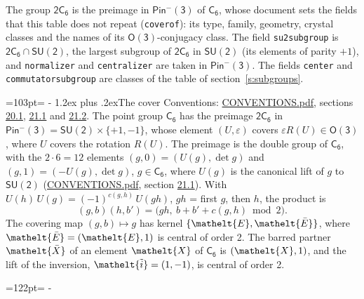\documentclass[10pt,a4paper]{article}
\makeatletter
\renewcommand\section{\@startsection{section}{1}{\z@}{-3ex plus -1ex minus -.2ex}%
  {1.2ex plus .2ex}{\normalfont\large\sffamily\bfseries\color{parttitle}}}
\newcommand{\needspace}[1]{\par\penalty-100\begingroup\dimen0=#1\relax\dimen2=\pagegoal
  \advance\dimen2-\pagetotal\ifdim\dimen0>\dimen2\relax\ifdim\dimen2>0pt\vfil\break\fi\fi
  \endgroup}
\numberwithin{equation}{section}
\newcommand{\eltfont}[1]{{\let\sigma\eltsigma\mathelt{#1}}}
\newcommand{\grp}[1]{\mathsf{#1}}
\newcommand{\elt}[1]{\eltfont{#1}}
\newcommand{\dirprod}{\times}
\newcommand{\barred}[1]{\bar{#1}}
\newcommand{\lift}[1]{\tilde{#1}}
\makeatother
\begin{document}
\leavevmode\label{n:element.inversion}\label{n:group.preimage}The group $\grp{2C_{6}}$ is the preimage in $\grp{Pin^{-}(3)}$ of \href{../../../rotation/data/pdf/C6.pdf}{$\grp{C_{6}}$}, whose document sets the fields that this table does not repeat (\texttt{coverof}): its type, family, geometry, crystal classes and the names of its \href{../../../rotation/data/pdf/O3.pdf}{$\grp{O(3)}$}-conjugacy class. The field \texttt{su2subgroup} is $\grp{2C_{6}} \cap \grp{SU(2)}$, the largest subgroup of $\grp{2C_{6}}$ in $\grp{SU(2)}$ (its elements of parity $+1$), and \texttt{normalizer} and \texttt{centralizer} are taken in $\grp{Pin^{-}(3)}$. The fields \texttt{center} and \texttt{commutatorsubgroup} are classes of the table of section~\ref{s:subgroups}.
\needspace{103pt}
\section{The cover}\label{s:cover}
Conventions: \href{../../CONVENTIONS.pdf}{CONVENTIONS.pdf}, sections \href{../../CONVENTIONS.pdf\#conv.20.1}{20.1}, \href{../../CONVENTIONS.pdf\#conv.21.1}{21.1} and \href{../../CONVENTIONS.pdf\#conv.21.2}{21.2}.
\leavevmode\label{n:group.pin.minus}\label{n:group.su2}\label{n:local.pin.sign}\label{n:matrix.covered}\label{n:matrix.lift.su2}\label{n:index.bar}The point group $\grp{C_{6}}$ has the preimage $\grp{2C_{6}}$ in $\grp{Pin^{-}(3)} = \grp{SU(2)} \dirprod \{+1, -1\}$, whose element $(U, \varepsilon)$ covers $\varepsilon R(U) \in \grp{O(3)}$, where $U$ covers the rotation $R(U)$. The preimage is the double group of $\grp{C_{6}}$, with the $2 \cdot 6 = 12$ elements $(g, 0) = (U(g), \det g)$ and $(g, 1) = (-U(g), \det g)$, $g \in \grp{C_{6}}$, where $U(g)$ is the canonical lift of $g$ to $\grp{SU(2)}$ (\href{../../CONVENTIONS.pdf}{CONVENTIONS.pdf}, section \href{../../CONVENTIONS.pdf\#conv.21.1}{21.1}). \label{n:function.cocycle}With $U(h)\,U(g) = (-1)^{c(g,h)}\,U(gh)$, $gh$ = first $g$, then $h$, the product is
\begin{equation}\label{e:product}(g, b)(h, b') = \bigl(gh,\ b + b' + c(g, h) \bmod 2\bigr).\end{equation}
\leavevmode\label{n:mark.bar}The covering map $(g, b) \mapsto g$ has kernel $\{\elt{E}, \elt{\barred{E}}\}$, where $\elt{\barred{E}} = (\elt{E}, 1)$ is central of order 2. \label{n:element.named}\label{n:mark.lift}The barred partner $\elt{\barred{X}}$ of an element $\elt{X}$ of $\grp{C_{6}}$ is $(\elt{X}, 1)$, and the lift of the inversion, $\elt{\lift{i}} = (1, -1)$, is central of order 2.
\needspace{122pt}
\end{document}

